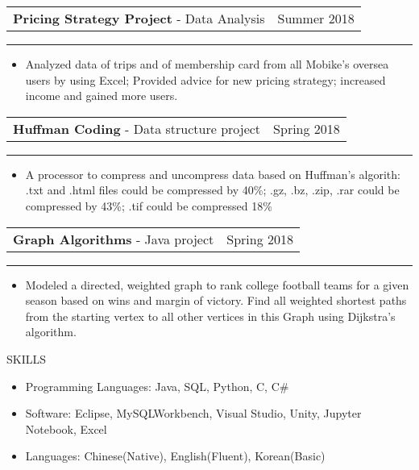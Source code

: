 \documentclass[letter,10.9pt]{article}
\makeatletter
\renewcommand{\section}{\@startsection
  {section}
  {12}
  {\z@}
  {0.1\baselineskip}
  {0.1\baselineskip}
  {\ruled@title}}
\newcommand{\ruled@title}[1]{
  \normalfont\large\scshape\bfseries #1\vskip2pt\hrule\vspace{0pt}}
\newcommand{\resentryproj}[5]{
  \begin{minipage}[t]{\linewidth}
    \setlength\tabcolsep{0pt}
    \begin{tabular*}{\linewidth}{l@{\extracolsep{\fill}}r@{}}
      \textbf{#1} #2 - #3 & #4 \\
    \end{tabular*}
    \rule{3pt}{0pt}
	#5
  \end{minipage}
}
\newenvironment{resitemize}
{\vspace{-10pt}
\begin{itemize}
\setlength{\parskip}{0ex}
\setlength{\leftskip}{-14pt}}
{\end{itemize}}
\makeatother
\begin{document}
\resentryproj
{Pricing Strategy Project}
{}
{Data Analysis}
{Summer 2018}
{
\begin{resitemize}
\item Analyzed data of trips and of membership card from all Mobike's oversea users by using Excel; Provided advice for new pricing strategy; increased income and gained more users.
\end{resitemize}

\resentryproj
{Huffman Coding}
{}
{Data structure project}
{Spring 2018}
{
\begin{resitemize}
\item A processor to compress and uncompress data based on Huffman's algorith: .txt and .html files could be compressed by 40\%; .gz, .bz, .zip, .rar could be compressed by 43\%; .tif could be compressed 18\%
\end{resitemize}
}

\resentryproj
{Graph Algorithms}
{}
{Java project}
{Spring 2018}
{
\begin{resitemize}
\item Modeled a directed, weighted graph to rank college football teams for a given season based on wins and margin of victory. Find all weighted shortest paths from the starting vertex to all other vertices in this Graph using Dijkstra's algorithm.
\end{resitemize}
}
}



\section{SKILLS}
\vspace{12pt}
\begin{resitemize}
\item Programming Languages: Java, SQL, Python, C, C\#
\item Software: Eclipse, MySQLWorkbench, Visual Studio, Unity, Jupyter Notebook, Excel
\item Languages: Chinese(Native), English(Fluent), Korean(Basic)
\end{resitemize}
\vspace{8pt}
\end{document}

